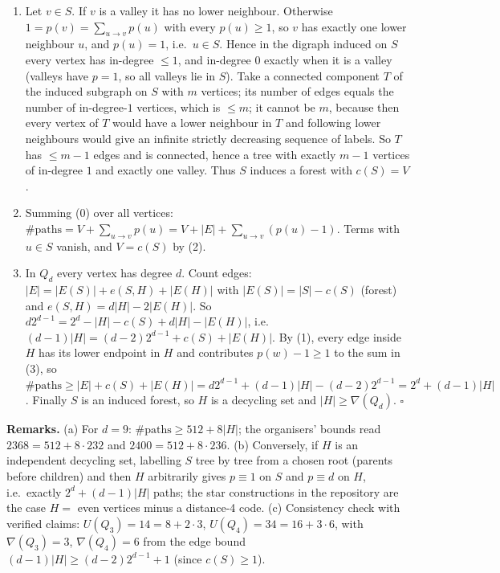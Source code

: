 \documentclass[11pt,a4paper]{article}
\begin{document}
\begin{enumerate}
\def\labelenumi{(\arabic{enumi})}
\setcounter{enumi}{1}
\item
  Let \(v\in S\). If \(v\) is a valley it has no lower neighbour.
  Otherwise \(1=p(v)=\sum_{u\to v}p(u)\) with every \(p(u)\ge1\), so
  \(v\) has exactly one lower neighbour \(u\), and \(p(u)=1\),
  i.e.~\(u\in S\). Hence in the digraph induced on \(S\) every vertex
  has in-degree \(\le 1\), and in-degree \(0\) exactly when it is a
  valley (valleys have \(p=1\), so all valleys lie in \(S\)). Take a
  connected component \(T\) of the induced subgraph on \(S\) with \(m\)
  vertices; its number of edges equals the number of in-degree-\(1\)
  vertices, which is \(\le m\); it cannot be \(m\), because then every
  vertex of \(T\) would have a lower neighbour in \(T\) and following
  lower neighbours would give an infinite strictly decreasing sequence
  of labels. So \(T\) has \(\le m-1\) edges and is connected, hence a
  tree with exactly \(m-1\) vertices of in-degree \(1\) and exactly one
  valley. Thus \(S\) induces a forest with \(c(S)=V\).
\item
  Summing (0) over all vertices:
  \(\#\text{paths}=V+\sum_{u\to v}p(u)=V+|E|+\sum_{u\to v}(p(u)-1)\).
  Terms with \(u\in S\) vanish, and \(V=c(S)\) by (2).
\item
  In \(Q_d\) every vertex has degree \(d\). Count edges:
  \(|E|=|E(S)|+e(S,H)+|E(H)|\) with \(|E(S)|=|S|-c(S)\) (forest) and
  \(e(S,H)=d|H|-2|E(H)|\). So \(d2^{d-1}=2^d-|H|-c(S)+d|H|-|E(H)|\),
  i.e.~\((d-1)|H|=(d-2)2^{d-1}+c(S)+|E(H)|\). By (1), every edge inside
  \(H\) has its lower endpoint in \(H\) and contributes \(p(w)-1\ge1\)
  to the sum in (3), so
  \(\#\text{paths}\ge|E|+c(S)+|E(H)|=d2^{d-1}+(d-1)|H|-(d-2)2^{d-1}=2^d+(d-1)|H|\).
  Finally \(S\) is an induced forest, so \(H\) is a decycling set and
  \(|H|\ge\nabla(Q_d)\). \(\square\)
\end{enumerate}

\textbf{Remarks.} (a) For \(d=9\): \(\#\text{paths}\ge 512+8|H|\); the
organisers' bounds read \(2368=512+8\cdot232\) and
\(2400=512+8\cdot236\). (b) Conversely, if \(H\) is an independent
decycling set, labelling \(S\) tree by tree from a chosen root (parents
before children) and then \(H\) arbitrarily gives \(p\equiv1\) on \(S\)
and \(p\equiv d\) on \(H\), i.e.~exactly \(2^d+(d-1)|H|\) paths; the
star constructions in the repository are the case \(H=\) even vertices
minus a distance-4 code. (c) Consistency check with verified claims:
\(U(Q_3)=14=8+2\cdot3\), \(U(Q_4)=34=16+3\cdot6\), with
\(\nabla(Q_3)=3\), \(\nabla(Q_4)=6\) from the edge bound
\((d-1)|H|\ge(d-2)2^{d-1}+1\) (since \(c(S)\ge1\)).
\end{document}
